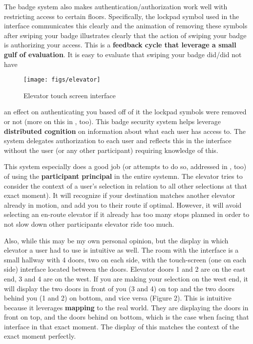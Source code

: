 The badge system also makes authentication/authorization work well with restricting access to certain floors. Specifically, the lockpad symbol used in the interface communicates this clearly and the animation of removing these symbols after swiping your badge illustrates clearly that the action of swiping your badge is authorizing your access. This is a \textbf{feedback cycle that leverage a small gulf of evaluation}. It is easy to evaluate that swiping your badge did/did not have

\clearpage

\begin{figure}[H]
  \centering
  \texttt{[image: figs/elevator]}
  \caption{Elevator touch screen interface}
  \label{fig::1}
\end{figure}

an effect on authenticating you based off of it the lockpad symbols were removed or not (more on this in , too). This badge security system helps leverage \textbf{distributed cognition} on information about what each user has access to. The system delegates authorization to each user and reflects this in the interface without the user (or any other participant) requiring knowledge of this.

This system especially does a good job (or attempts to do so, addressed in , too) of using the \textbf{participant principal} in the entire systemn. The elevator tries to consider the context of a user's selection in relation to all other selections at that exact moment). It will recognize if your destination matches another elevator already in motion, and add you to their route if optimal. However, it will avoid selecting an en-route elevator if it already has too many stops planned in order to not slow down other participants elevator ride too much.

Also, while this may be my own personal opinion, but the display in which elevator a user had to use is intuitive as well. The room with the interface is a small hallway with 4 doors, two on each side, with the touch-screen (one on each side) interface located between the doors. Elevator doors 1 and 2 are on the east end, 3 and 4 are on the west. If you are making your selection on the west end, it will display the two doors in front of you (3 and 4) on top and the two doors behind you (1 and 2) on bottom, and vice versa (Figure 2). This is intuitive because it leverages \textbf{mapping} to the real world. They are displaying the doors in front on top, and the doors behind on bottom, which is the case when facing that interface in that exact moment. The display of this matches the context of the exact moment perfectly.

